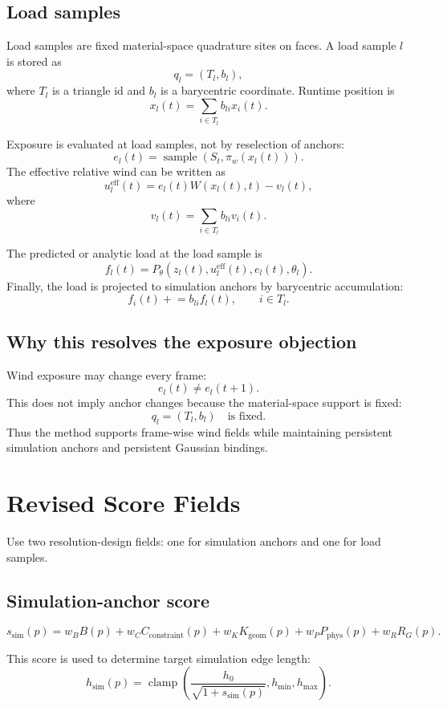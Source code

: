 \documentclass[11pt,a4paper]{article}
\newcommand{\clamp}{\operatorname{clamp}}
\begin{document}
\subsection{Load samples}

Load samples are fixed material-space quadrature sites on faces. A load sample $l$ is stored as
\[
q_l=(T_l,b_l),
\]
where $T_l$ is a triangle id and $b_l$ is a barycentric coordinate. Runtime position is
\[
x_l(t)=\sum_{i\in T_l} b_{li}x_i(t).
\]

Exposure is evaluated at load samples, not by reselection of anchors:
\[
e_l(t)=\operatorname{sample}\left(S_t,\pi_w(x_l(t))\right).
\]
The effective relative wind can be written as
\[
u_l^{\mathrm{eff}}(t)=e_l(t)W(x_l(t),t)-v_l(t),
\]
where
\[
v_l(t)=\sum_{i\in T_l}b_{li}v_i(t).
\]

The predicted or analytic load at the load sample is
\[
f_l(t)=P_\theta\left(z_l(t),u_l^{\mathrm{eff}}(t),e_l(t),\theta_l\right).
\]
Finally, the load is projected to simulation anchors by barycentric accumulation:
\[
f_i(t) \mathrel{+}= b_{li} f_l(t),\qquad i\in T_l.
\]

\subsection{Why this resolves the exposure objection}

Wind exposure may change every frame:
\[
e_l(t)\neq e_l(t+1).
\]
This does not imply anchor changes because the material-space support is fixed:
\[
q_l=(T_l,b_l)\quad\text{is fixed.}
\]
Thus the method supports frame-wise wind fields while maintaining persistent simulation anchors and persistent Gaussian bindings.

\section{Revised Score Fields}

Use two resolution-design fields: one for simulation anchors and one for load samples.

\subsection{Simulation-anchor score}

\[
s_{\mathrm{sim}}(p)=
 w_B B(p)
+w_C C_{\mathrm{constraint}}(p)
+w_K K_{\mathrm{geom}}(p)
+w_P P_{\mathrm{phys}}(p)
+w_R R_G(p).
\]

This score is used to determine target simulation edge length:
\[
h_{\mathrm{sim}}(p)=
\clamp\left(
\frac{h_0}{\sqrt{1+s_{\mathrm{sim}}(p)}},
h_{\min},h_{\max}
\right).
\]
\end{document}
